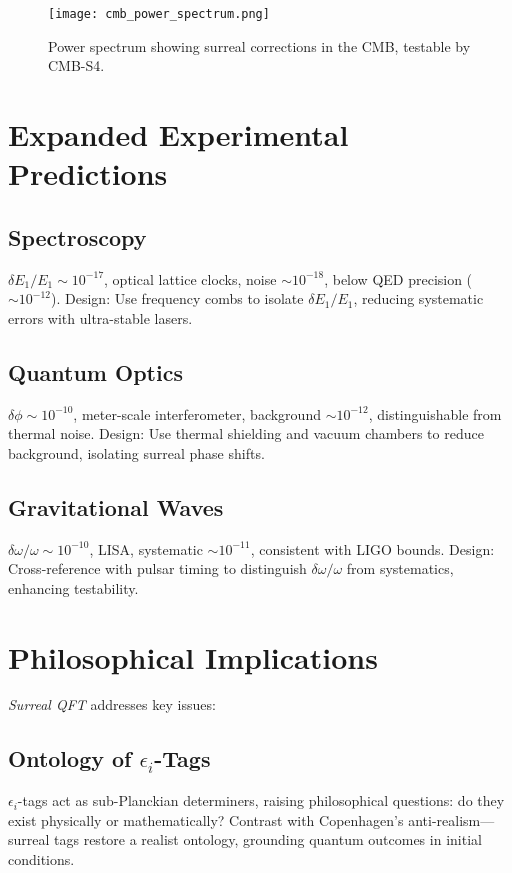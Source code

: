 \documentclass{article}
\begin{document}
\begin{figure}[htbp]
    \centering
    \texttt{[image: cmb\_power\_spectrum.png]}
    \caption{Power spectrum showing surreal corrections in the CMB, testable by CMB-S4.}
    \label{fig:cmb_spectrum}
\end{figure}

\section{Expanded Experimental Predictions}
\subsection{Spectroscopy}
\(\delta E_1 / E_1 \sim 10^{-17}\), optical lattice clocks, noise \(\sim 10^{-18}\), below QED precision (\(\sim 10^{-12}\)). Design: Use frequency combs to isolate \(\delta E_1 / E_1\), reducing systematic errors with ultra-stable lasers.

\subsection{Quantum Optics}
\(\delta \phi \sim 10^{-10}\), meter-scale interferometer, background \(\sim 10^{-12}\), distinguishable from thermal noise. Design: Use thermal shielding and vacuum chambers to reduce background, isolating surreal phase shifts.

\subsection{Gravitational Waves}
\(\delta \omega / \omega \sim 10^{-10}\), LISA, systematic \(\sim 10^{-11}\), consistent with LIGO bounds. Design: Cross-reference with pulsar timing to distinguish \(\delta \omega / \omega\) from systematics, enhancing testability.

\section{Philosophical Implications}
\textit{Surreal QFT} addresses key issues:
\subsection{Ontology of \(\epsilon_i\)-Tags}
\(\epsilon_i\)-tags act as sub-Planckian determiners, raising philosophical questions: do they exist physically or mathematically? Contrast with Copenhagen's anti-realism---surreal tags restore a realist ontology, grounding quantum outcomes in initial conditions.
\end{document}
